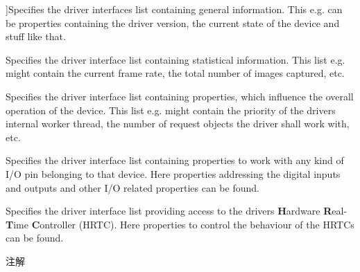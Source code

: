 \begin{Desc}
\begin{description}
{}]Specifies the driver interfaces list containing general information. This e.\+g. can be properties containing the driver version, the current state of the device and stuff like that. \item[{\em 
\hypertarget{group___common_interface_gga0dca79bbf0803a4ecec16d6cbb1a3dbba73657baf752ee9e431a51ba4b5115ba2}{dlt\+Statistics}\label{group___common_interface_gga0dca79bbf0803a4ecec16d6cbb1a3dbba73657baf752ee9e431a51ba4b5115ba2}
}]Specifies the driver interface list containing statistical information. This list e.\+g. might contain the current frame rate, the total number of images captured, etc. \item[{\em 
\hypertarget{group___common_interface_gga0dca79bbf0803a4ecec16d6cbb1a3dbba451b7b4dc17494c9775bc6bdc3fecaa6}{dlt\+System\+Settings}\label{group___common_interface_gga0dca79bbf0803a4ecec16d6cbb1a3dbba451b7b4dc17494c9775bc6bdc3fecaa6}
}]Specifies the driver interface list containing properties, which influence the overall operation of the device. This list e.\+g. might contain the priority of the drivers internal worker thread, the number of request objects the driver shall work with, etc. \item[{\em 
\hypertarget{group___common_interface_gga0dca79bbf0803a4ecec16d6cbb1a3dbba813278e6d24db6a0cbc7f9aa234a075e}{dlt\+I\+O\+Sub\+System}\label{group___common_interface_gga0dca79bbf0803a4ecec16d6cbb1a3dbba813278e6d24db6a0cbc7f9aa234a075e}
}]Specifies the driver interface list containing properties to work with any kind of I/\+O pin belonging to that device. Here properties addressing the digital inputs and outputs and other I/\+O related properties can be found. \item[{\em 
\hypertarget{group___common_interface_gga0dca79bbf0803a4ecec16d6cbb1a3dbba54d331c9a054f6363890e43456d7245d}{dlt\+R\+T\+Ctr}\label{group___common_interface_gga0dca79bbf0803a4ecec16d6cbb1a3dbba54d331c9a054f6363890e43456d7245d}
}]Specifies the driver interface list providing access to the drivers {\bfseries H}ardware {\bfseries R}eal-\/{\bfseries T}ime {\bfseries C}ontroller (H\+R\+T\+C). Here properties to control the behaviour of the H\+R\+T\+Cs can be found. \begin{DoxyNote}{注解}

\end{DoxyNote}
\end{description}
\end{Desc}
